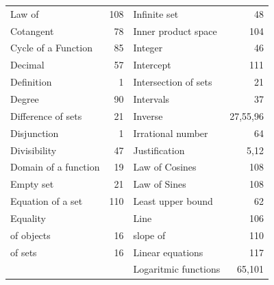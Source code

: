 \begin{tabular}{l r l r}
\q Law of &108 &Infinite set &48\\
Cotangent& 78 &Inner product space &104\\
Cycle of a Function& 85 &Integer& 46\\
Decimal &57 &Intercept &111\\
Definition& 1 &Intersection of sets &21\\
Degree &90 &Intervals &37\\
Difference of sets& 21 &Inverse &27,55,96\\
Disjunction& 1 &Irrational number &64\\
Divisibility& 47& Justification &5,12\\
Domain of a function& 19 &Law of Cosines &108\\
Empty set &21 &Law of Sines &108\\
Equation of a set& 110 &Least upper bound &62\\
Equality &&Line &106\\
\q of objects &16 &\q slope of &110\\
\q of sets &16&Linear equations&117\\
&&Logaritmic functions&65,101\\

\end{tabular}

